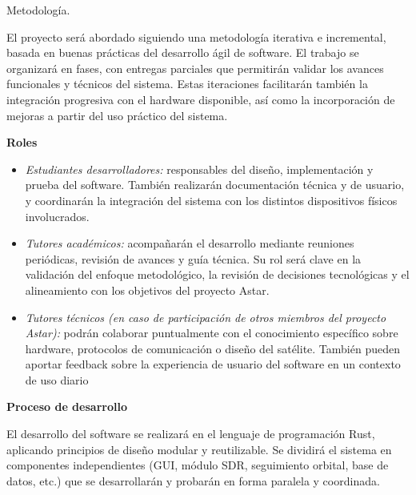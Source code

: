 
Metodología.

El proyecto será abordado siguiendo una metodología iterativa e incremental, basada en buenas prácticas del desarrollo ágil de software. El trabajo se organizará en fases, con entregas parciales que permitirán validar los avances funcionales y técnicos del sistema. Estas iteraciones facilitarán también la integración progresiva con el hardware disponible, así como la incorporación de mejoras a partir del uso práctico del sistema.

\textbf{Roles}

\begin{itemize}
    \item \textit{Estudiantes desarrolladores:} responsables del diseño, implementación y prueba del software. También realizarán documentación técnica y de usuario, y coordinarán la integración del sistema con los distintos dispositivos físicos involucrados.
    
    \item \textit{Tutores académicos:} acompañarán el desarrollo mediante reuniones periódicas, revisión de avances y guía técnica. Su rol será clave en la validación del enfoque metodológico, la revisión de decisiones tecnológicas y el alineamiento con los objetivos del proyecto Astar.
    
    \item \textit{Tutores técnicos (en caso de participación de otros miembros del proyecto Astar):} podrán colaborar puntualmente con el conocimiento específico sobre hardware, protocolos de comunicación o diseño del satélite. También pueden aportar feedback sobre la experiencia de usuario del software en un contexto de uso diario
\end{itemize}
    
\textbf{Proceso de desarrollo}

El desarrollo del software se realizará en el lenguaje de programación Rust, aplicando principios de diseño modular y reutilizable. Se dividirá el sistema en componentes independientes (GUI, módulo SDR, seguimiento orbital, base de datos, etc.) que se desarrollarán y probarán en forma paralela y coordinada.

